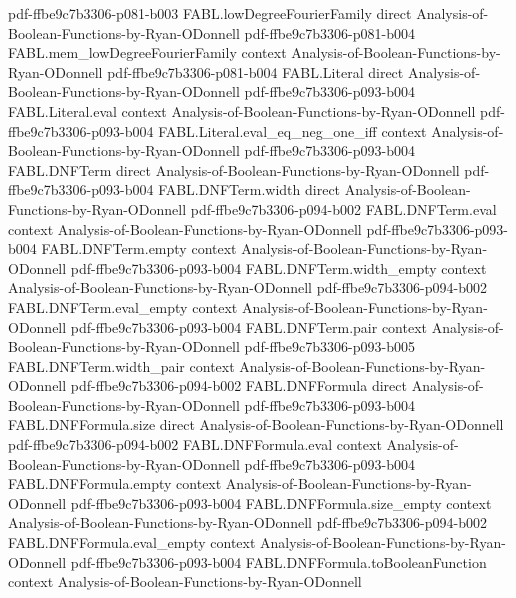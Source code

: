 \begin{theorem}
  {pdf-ffbe9c7b3306-p081-b003}
\proofstep
  {FABL.lowDegreeFourierFamily}
  {direct}
  {Analysis-of-Boolean-Functions-by-Ryan-ODonnell}
  {pdf-ffbe9c7b3306-p081-b004}
\proofstep
  {FABL.mem_lowDegreeFourierFamily}
  {context}
  {Analysis-of-Boolean-Functions-by-Ryan-ODonnell}
  {pdf-ffbe9c7b3306-p081-b004}
\proofstep
  {FABL.Literal}
  {direct}
  {Analysis-of-Boolean-Functions-by-Ryan-ODonnell}
  {pdf-ffbe9c7b3306-p093-b004}
\proofstep
  {FABL.Literal.eval}
  {context}
  {Analysis-of-Boolean-Functions-by-Ryan-ODonnell}
  {pdf-ffbe9c7b3306-p093-b004}
\proofstep
  {FABL.Literal.eval_eq_neg_one_iff}
  {context}
  {Analysis-of-Boolean-Functions-by-Ryan-ODonnell}
  {pdf-ffbe9c7b3306-p093-b004}
\proofstep
  {FABL.DNFTerm}
  {direct}
  {Analysis-of-Boolean-Functions-by-Ryan-ODonnell}
  {pdf-ffbe9c7b3306-p093-b004}
\proofstep
  {FABL.DNFTerm.width}
  {direct}
  {Analysis-of-Boolean-Functions-by-Ryan-ODonnell}
  {pdf-ffbe9c7b3306-p094-b002}
\proofstep
  {FABL.DNFTerm.eval}
  {context}
  {Analysis-of-Boolean-Functions-by-Ryan-ODonnell}
  {pdf-ffbe9c7b3306-p093-b004}
\proofstep
  {FABL.DNFTerm.empty}
  {context}
  {Analysis-of-Boolean-Functions-by-Ryan-ODonnell}
  {pdf-ffbe9c7b3306-p093-b004}
\proofstep
  {FABL.DNFTerm.width_empty}
  {context}
  {Analysis-of-Boolean-Functions-by-Ryan-ODonnell}
  {pdf-ffbe9c7b3306-p094-b002}
\proofstep
  {FABL.DNFTerm.eval_empty}
  {context}
  {Analysis-of-Boolean-Functions-by-Ryan-ODonnell}
  {pdf-ffbe9c7b3306-p093-b004}
\proofstep
  {FABL.DNFTerm.pair}
  {context}
  {Analysis-of-Boolean-Functions-by-Ryan-ODonnell}
  {pdf-ffbe9c7b3306-p093-b005}
\proofstep
  {FABL.DNFTerm.width_pair}
  {context}
  {Analysis-of-Boolean-Functions-by-Ryan-ODonnell}
  {pdf-ffbe9c7b3306-p094-b002}
\proofstep
  {FABL.DNFFormula}
  {direct}
  {Analysis-of-Boolean-Functions-by-Ryan-ODonnell}
  {pdf-ffbe9c7b3306-p093-b004}
\proofstep
  {FABL.DNFFormula.size}
  {direct}
  {Analysis-of-Boolean-Functions-by-Ryan-ODonnell}
  {pdf-ffbe9c7b3306-p094-b002}
\proofstep
  {FABL.DNFFormula.eval}
  {context}
  {Analysis-of-Boolean-Functions-by-Ryan-ODonnell}
  {pdf-ffbe9c7b3306-p093-b004}
\proofstep
  {FABL.DNFFormula.empty}
  {context}
  {Analysis-of-Boolean-Functions-by-Ryan-ODonnell}
  {pdf-ffbe9c7b3306-p093-b004}
\proofstep
  {FABL.DNFFormula.size_empty}
  {context}
  {Analysis-of-Boolean-Functions-by-Ryan-ODonnell}
  {pdf-ffbe9c7b3306-p094-b002}
\proofstep
  {FABL.DNFFormula.eval_empty}
  {context}
  {Analysis-of-Boolean-Functions-by-Ryan-ODonnell}
  {pdf-ffbe9c7b3306-p093-b004}
\proofstep
  {FABL.DNFFormula.toBooleanFunction}
  {context}
  {Analysis-of-Boolean-Functions-by-Ryan-ODonnell}

\end{theorem}
